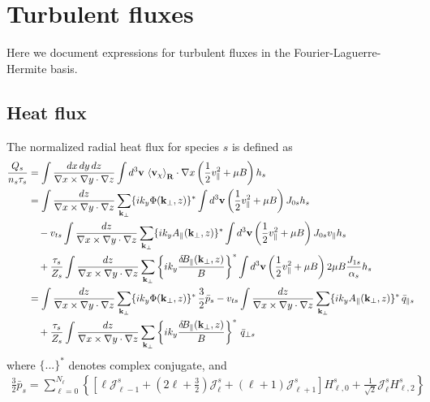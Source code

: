 \documentclass{jpp}
\begin{document}
{\color{black}
\section{Turbulent fluxes}
\label{app:fluxes}
Here we document expressions for turbulent fluxes in the Fourier-Laguerre-Hermite basis.
\subsection{Heat flux}
The normalized radial heat flux for species $s$ is defined as
\begin{align}
\frac{Q_s}{n_s \tau_s} &= \int \frac{dx\, dy\, dz}{\nabla x\times\nabla y\cdot\nabla z}\int d^3{\bf v}\ \gyavgR{\vEM} \cdot\nabla x
\left(\frac{1}{2}v_\parallel^2 + \mu B\right) h_s \notag \\
&= \int \frac{dz}{\nabla x\times\nabla y\cdot\nabla z}\sum_{{\bf k}_\perp} \{i k_y \Phi({\bf k_\perp},z)\}^*\int d^3{\bf v}\left(\frac{1}{2}v_\parallel^2 + \mu B\right) J_{0s} h_s \notag \\
&\quad - v_{ts} \int \frac{dz}{\nabla x\times\nabla y\cdot\nabla z}\sum_{{\bf k}_\perp} \{i k_y A_\parallel({\bf k_\perp},z)\}^* \int d^3{\bf v} \left(\frac{1}{2}v_\parallel^2 + \mu B\right)  J_{0s} v_\parallel h_s \notag \\
&\quad + \frac{\tau_s}{Z_s} \int \frac{dz}{\nabla x\times\nabla y\cdot\nabla z}\sum_{{\bf k}_\perp}   \left\{ik_y\frac{\delta\! B_\parallel({\bf k_\perp},z)}{B}\right\}^* \int d^3{\bf v} \left(\frac{1}{2}v_\parallel^2 + \mu B\right) 2\mu B \frac{J_{1s}}{\alpha_s} h_s \notag \\
%
&= \int \frac{dz}{\nabla x\times\nabla y\cdot\nabla z}\sum_{{\bf k}_\perp} \{i k_y \Phi({\bf k_\perp},z)\}^*\, \frac{3}{2}\bar{p}_s 
- v_{ts} \int \frac{dz}{\nabla x\times\nabla y\cdot\nabla z}\sum_{{\bf k}_\perp} \{i k_y A_\parallel({\bf k_\perp},z)\}^*\, \bar{q}_{\parallel s}\notag \\
&\quad + \frac{\tau_s}{Z_s} \int \frac{dz}{\nabla x\times\nabla y\cdot\nabla z}\sum_{{\bf k}_\perp}   \left\{ik_y\frac{\delta\! B_\parallel({\bf k_\perp},z)}{B}\right\}^*\, \bar{q}_{\perp s}
\end{align} 
where $\{...\}^*$ denotes complex conjugate, and
\begin{gather}
    \frac{3}{2}\bar{p}_s = \sum_{\ell=0}^{N_\ell} \left\{ 
  \left[\ell \mathcal{J}^s_{\ell-1}+ (2\ell+\frac{3}{2})\mathcal{J}^s_\ell
     + (\ell+1)\mathcal{J}^s_{\ell+1}\right] H^s_{\ell,0} + \frac{1}{\sqrt{2}}\mathcal{J}^s_\ell H^s_{\ell,2} \right\} \\

\end{gather}}
\end{document}
